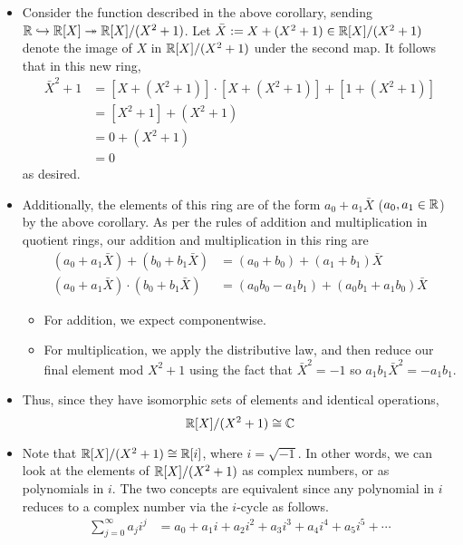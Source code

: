 \documentclass[../notes.tex]{subfiles}
\begin{document}
\begin{itemize}
\begin{itemize}
        \item Consider the function described in the above corollary, sending $\mathbb{R}\hookrightarrow\mathbb{R}[X]\twoheadrightarrow\mathbb{R}[X]/(X^2+1)$. Let $\bar{X}:=X+(X^2+1)\in\mathbb{R}[X]/(X^2+1)$ denote the image of $X$ in $\mathbb{R}[X]/(X^2+1)$ under the second map. It follows that in this new ring,
        \begin{align*}
            \bar{X}^2+1 &= [X+(X^2+1)]\cdot[X+(X^2+1)]+[1+(X^2+1)]\\
            &= [X^2+1]+(X^2+1)\\
            &= 0+(X^2+1)\\
            &= 0
        \end{align*}
        as desired.
        \item Additionally, the elements of this ring are of the form $a_0+a_1\bar{X}$ ($a_0,a_1\in\mathbb{R}$) by the above corollary. As per the rules of addition and multiplication in quotient rings, our addition and multiplication in this ring are
        \begin{align*}
            (a_0+a_1\bar{X})+(b_0+b_1\bar{X}) &= (a_0+b_0)+(a_1+b_1)\bar{X}\\
            (a_0+a_1\bar{X})\cdot(b_0+b_1\bar{X}) &= (a_0b_0-a_1b_1)+(a_0b_1+a_1b_0)\bar{X}
        \end{align*}
        \begin{itemize}
            \item For addition, we expect componentwise.
            \item For multiplication, we apply the distributive law, and then reduce our final element mod $X^2+1$ using the fact that $\bar{X}^2=-1$ so $a_1b_1\bar{X}^2=-a_1b_1$.
        \end{itemize}
        \item Thus, since they have isomorphic sets of elements and identical operations,
        \begin{equation*}
            \mathbb{R}[X]/(X^2+1) \cong \mathbb{C}
        \end{equation*}
        \item Note that $\mathbb{R}[X]/(X^2+1)\cong\mathbb{R}[i]$, where $i=\sqrt{-1}$. In other words, we can look at the elements of $\mathbb{R}[X]/(X^2+1)$ as complex numbers, or as polynomials in $i$. The two concepts are equivalent since any polynomial in $i$ reduces to a complex number via the $i$-cycle as follows.
        \begin{align*}
            \sum_{j=0}^\infty a_ji^j &= a_0+a_1i+a_2i^2+a_3i^3+a_4i^4+a_5i^5+\cdots\\

\end{align*}
\end{itemize}
\end{itemize}
\end{document}
